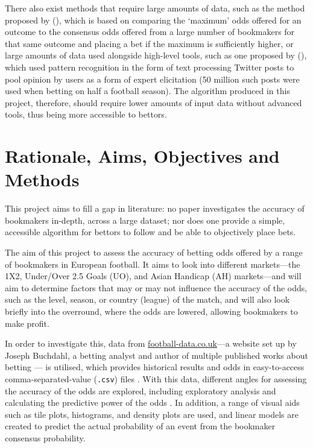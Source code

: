 \documentclass[a4paper,10pt]{report}
\begin{document}
There also exist methods that require large amounts of data, such as the method proposed by \citeauthor{kaunitz17} (\citeyear{kaunitz17}), which is based on comparing the `maximum’ odds offered for an outcome to the consensus odds offered from a large number of bookmakers for that same outcome and placing a bet if the maximum is sufficiently higher, or large amounts of data used alongside high-level tools, such as one proposed by \citeauthor{godin14} (\citeyear{godin14}), which used pattern recognition in the form of text processing Twitter posts to pool opinion by users as a form of expert elicitation (50 million such posts were used when betting on half a football season). The algorithm produced in this project, therefore, should require lower amounts of input data without advanced tools, thus being more accessible to bettors.

\section{Rationale, Aims, Objectives and Methods} \label{sec:aimsobjectives}
This project aims to fill a gap in literature: no paper investigates the accuracy of bookmakers in-depth, across a large dataset; nor does one provide a simple, accessible algorithm for bettors to follow and be able to objectively place bets. \vspace{3mm}

The aim of this project to assess the accuracy of betting odds offered by a range of bookmakers in European football. It aims to look into different markets---the 1X2, Under/Over 2.5 Goals (UO), and Asian Handicap (AH) markets---and will aim to determine factors that may or may not influence the accuracy of the odds, such as the level, season, or country (league) of the match, and will also look briefly into the overround, where the odds are lowered, allowing bookmakers to make profit.\vspace{3mm}

In order to investigate this, data from \url{football-data.co.uk}---a website set up by Joseph Buchdahl, a betting analyst and author of multiple published works about betting \autocite{BuchdahlAbout}--- is utilised, which provides historical results and odds in easy-to-access comma-separated-value (\lstinline|.csv|) files \autocite{FootballDataAbout}. With this data, different angles for assessing the accuracy of the odds are explored, including exploratory analysis \autocite{Hoaglin77} and calculating the predictive power of the odds \autocite{Owen09}. In addition, a range of visual aids such as tile plots, histograms, and density plots are used, and linear models are created to predict the actual probability of an event from the bookmaker consensus probability. \vspace{3mm} 
\end{document}
